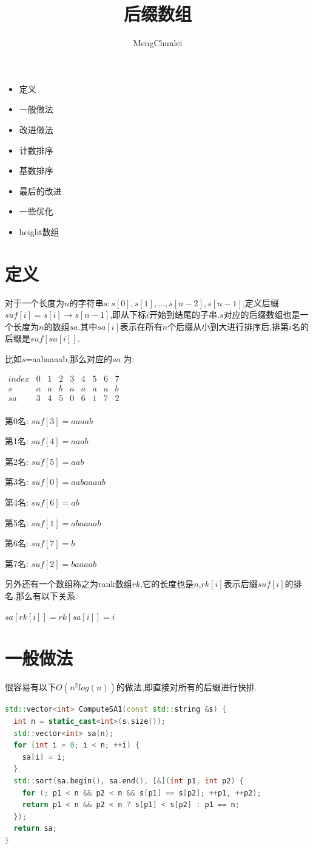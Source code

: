 \documentclass{article}
\title{后缀数组}
\author{MengChunlei}
\begin{document}
\maketitle
\begin{itemize}
	\item 定义
	\item 一般做法
	\item 改进做法
	\item 计数排序
	\item 基数排序
	\item 最后的改进
	\item 一些优化
	\item height数组
\end{itemize}
\section{定义}
对于一个长度为$n$的字符串$s:s[0],s[1],...,s[n-2],s[n-1]$,定义后缀$suf[i]=s[i]\rightarrow s[n-1]$,即从下标$i$开始到结尾的子串.$s$对应的后缀数组也是一个长度为$n$的数组$sa$.其中$sa[i]$表示在所有$n$个后缀从小到大进行排序后,排第$i$名的后缀是$suf[sa[i]]$. \par
比如$s$=aabaaaab,那么对应的$sa$ 为: \par
$\begin{matrix} 
index & 0 & 1 & 2 & 3 & 4 & 5 & 6 & 7 \\ 
s & a & a & b & a & a & a & a & b \\ 
sa & 3 & 4 & 5 & 0 & 6 & 1 & 7 & 2 \\
\end{matrix}$ \par
第0名: $suf[3]=aaaab$\par
第1名: $suf[4]=aaab$\par
第2名: $suf[5]=aab$\par
第3名: $suf[0]=aabaaaab$\par
第4名: $suf[6]=ab$\par
第5名: $suf[1]=abaaaab$\par
第6名: $suf[7]=b$\par
第7名: $suf[2]=baaaab$\par
另外还有一个数组称之为rank数组$rk$,它的长度也是$n$,$rk[i]$表示后缀$suf[i]$的排名.那么有以下关系: \par
$sa[rk[i]]=rk[sa[i]]=i$ \par
\section{一般做法}
很容易有以下$O(n^{2}log(n))$的做法,即直接对所有的后缀进行快排. \par
\begin{lstlisting}[language=C++, caption={Normal}]
std::vector<int> ComputeSA1(const std::string &s) {
  int n = static_cast<int>(s.size());
  std::vector<int> sa(n);
  for (int i = 0; i < n; ++i) {
    sa[i] = i;
  }
  std::sort(sa.begin(), sa.end(), [&](int p1, int p2) {
    for (; p1 < n && p2 < n && s[p1] == s[p2]; ++p1, ++p2);
    return p1 < n && p2 < n ? s[p1] < s[p2] : p1 == n;
  });
  return sa;
}
\end{lstlisting}
\end{document}
